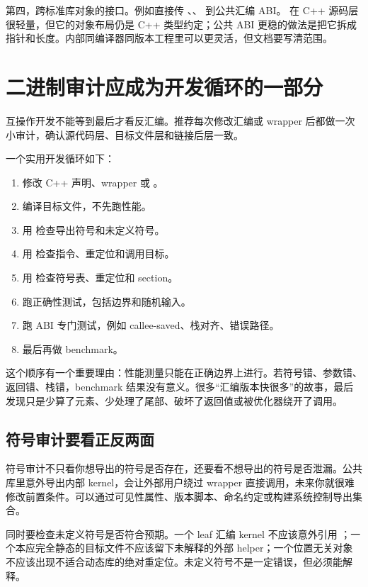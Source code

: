 第四，跨标准库对象的接口。例如直接传 、、 到公共汇编 ABI。  在 C++ 源码层很轻量，但它的对象布局仍是 C++ 类型约定；公共 ABI 更稳的做法是把它拆成指针和长度。内部同编译器同版本工程里可以更灵活，但文档要写清范围。

\section{二进制审计应成为开发循环的一部分}

互操作开发不能等到最后才看反汇编。推荐每次修改汇编或 wrapper 后都做一次小审计，确认源代码层、目标文件层和链接后层一致。

一个实用开发循环如下：

\begin{enumerate}
  \item 修改 C++ 声明、wrapper 或 。
  \item 编译目标文件，不先跑性能。
  \item 用  检查导出符号和未定义符号。
  \item 用  检查指令、重定位和调用目标。
  \item 用  检查符号表、重定位和 section。
  \item 跑正确性测试，包括边界和随机输入。
  \item 跑 ABI 专门测试，例如 callee-saved、栈对齐、错误路径。
  \item 最后再做 benchmark。
\end{enumerate}

这个顺序有一个重要理由：性能测量只能在正确边界上进行。若符号错、参数错、返回错、栈错，benchmark 结果没有意义。很多“汇编版本快很多”的故事，最后发现只是少算了元素、少处理了尾部、破坏了返回值或被优化器绕开了调用。

\subsection{符号审计要看正反两面}

符号审计不只看你想导出的符号是否存在，还要看不想导出的符号是否泄漏。公共库里意外导出内部 kernel，会让外部用户绕过 wrapper 直接调用，未来你就很难修改前置条件。可以通过可见性属性、版本脚本、命名约定或构建系统控制导出集合。

同时要检查未定义符号是否符合预期。一个 leaf 汇编 kernel 不应该意外引用 ；一个本应完全静态的目标文件不应该留下未解释的外部 helper；一个位置无关对象不应该出现不适合动态库的绝对重定位。未定义符号不是一定错误，但必须能解释。

